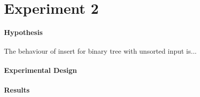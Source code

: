 \documentclass[a4]{article}
\begin{document}


\section{Experiment 2}

\paragraph{Hypothesis}  The behaviour of insert for binary tree with unsorted input is...


\paragraph{Experimental Design} 









\paragraph{Results} 

\end{document}
